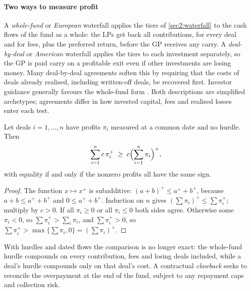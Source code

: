 \begin{chapterrefs}
\paragraph{Two ways to measure profit}
A \emph{whole-fund} or \emph{European} waterfall applies the tiers of \cref{sec2:waterfall} to the cash
flows of the fund as a whole: the LPs get back all contributions, for every deal and for fees, plus the
preferred return, before the GP receives any carry. A \emph{deal-by-deal} or \emph{American} waterfall
applies the tiers to each investment separately, so the GP is paid carry on a profitable exit even if
other investments are losing money. Many deal-by-deal agreements soften this by requiring that the
costs of deals already realised, including written-off deals, be recovered first. Investor guidance
generally favours the whole-fund form \parencite{ilpa2019}. Both descriptions are simplified
archetypes; agreements differ in how invested capital, fees and realised losses enter each test.

\begin{proposition}\label{prop2:subadd}
Let deals $i = 1,\dots,n$ have profits $\pi_i$ measured at a common date and no hurdle. Then
\begin{equation}\label{eq2:subadd}
  \sum_{i=1}^{n} c\,\pi_i^{+} \;\ge\; c\Bigl(\sum_{i=1}^{n}\pi_i\Bigr)^{+},
\end{equation}
with equality if and only if the nonzero profits all have the same sign.
\end{proposition}
\begin{proof}
The function $x\mapsto x^{+}$ is subadditive: $(a+b)^{+} \le a^{+} + b^{+}$, because $a+b \le a^{+}+b^{+}$
and $0 \le a^{+}+b^{+}$. Induction on $n$ gives $(\sum\pi_i)^{+} \le \sum\pi_i^{+}$; multiply by $c>0$. If
all $\pi_i \ge 0$ or all $\pi_i \le 0$ both sides agree. Otherwise some $\pi_i<0$, so $\sum\pi_i^{+} > \sum_i \pi_i$,
and $\sum\pi_i^{+} > 0$, so $\sum\pi_i^{+} > \max\{\sum\pi_i, 0\} = (\sum\pi_i)^{+}$.
\end{proof}

With hurdles and dated flows the comparison is no longer exact: the whole-fund hurdle compounds on
every contribution, fees and losing deals included, while a deal's hurdle compounds only on that
deal's cost. A contractual \emph{clawback} seeks to reconcile the overpayment at the end of the fund,
subject to any repayment caps and collection risk.


\end{chapterrefs}
